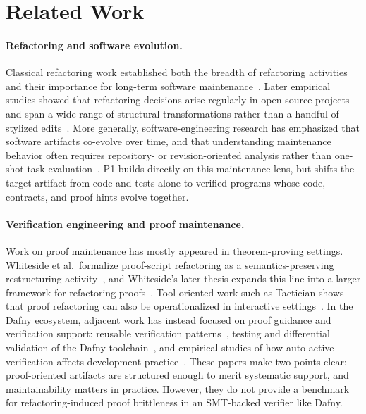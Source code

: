\section{Related Work}

\paragraph{Refactoring and software evolution.}
Classical refactoring work established both the breadth of refactoring activities and their importance for long-term software maintenance~\cite{Mens2004RefactoringSurvey}. Later empirical studies showed that refactoring decisions arise regularly in open-source projects and span a wide range of structural transformations rather than a handful of stylized edits~\cite{Kim2012RefactoringInTheWild,Tsantalis2014RefactoringOperations}. More generally, software-engineering research has emphasized that software artifacts co-evolve over time, and that understanding maintenance behavior often requires repository- or revision-oriented analysis rather than one-shot task evaluation~\cite{Zaidman2010CoEvolutionProductionTest}. P1 builds directly on this maintenance lens, but shifts the target artifact from code-and-tests alone to verified programs whose code, contracts, and proof hints evolve together.

\paragraph{Verification engineering and proof maintenance.}
Work on proof maintenance has mostly appeared in theorem-proving settings. Whiteside et al.\ formalize proof-script refactoring as a semantics-preserving restructuring activity~\cite{Whiteside2011ProofScriptRefactoring}, and Whiteside's later thesis expands this line into a larger framework for refactoring proofs~\cite{Whiteside2013RefactoringProofs}. Tool-oriented work such as Tactician shows that proof refactoring can also be operationalized in interactive settings~\cite{Adams2015Tactician}. In the Dafny ecosystem, adjacent work has instead focused on proof guidance and verification support: reusable verification patterns~\cite{Grov2016VerificationPatternsDafny}, testing and differential validation of the Dafny toolchain~\cite{Irfan2022TestingDafny,Fedchin2023ToolkitTestingDafny}, and empirical studies of how auto-active verification affects development practice~\cite{Mugnier2025ImpactVerification}. These papers make two points clear: proof-oriented artifacts are structured enough to merit systematic support, and maintainability matters in practice. However, they do not provide a benchmark for refactoring-induced proof brittleness in an SMT-backed verifier like Dafny.


